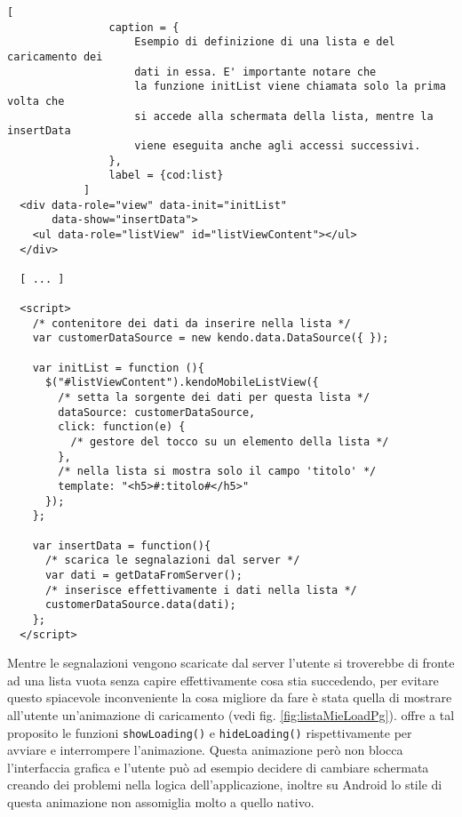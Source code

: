             \begin{lstlisting}[
                caption = {
                    Esempio di definizione di una lista e del caricamento dei
                    dati in essa. E' importante notare che
                    la funzione initList viene chiamata solo la prima volta che
                    si accede alla schermata della lista, mentre la insertData
                    viene eseguita anche agli accessi successivi.
                },
                label = {cod:list}
            ]
  <div data-role="view" data-init="initList"
       data-show="insertData">
    <ul data-role="listView" id="listViewContent"></ul>
  </div>

  [ ... ]

  <script>
    /* contenitore dei dati da inserire nella lista */
    var customerDataSource = new kendo.data.DataSource({ });

    var initList = function (){
      $("#listViewContent").kendoMobileListView({
        /* setta la sorgente dei dati per questa lista */
        dataSource: customerDataSource,
        click: function(e) {
          /* gestore del tocco su un elemento della lista */
        },
        /* nella lista si mostra solo il campo 'titolo' */
        template: "<h5>#:titolo#</h5>"
      });
    };

    var insertData = function(){
      /* scarica le segnalazioni dal server */
      var dati = getDataFromServer();
      /* inserisce effettivamente i dati nella lista */
      customerDataSource.data(dati);
    };
  </script>
            \end{lstlisting}
            \noindent Mentre le segnalazioni vengono scaricate dal server l'utente si
            troverebbe di fronte ad una lista vuota senza capire effettivamente
            cosa stia succedendo, per evitare questo spiacevole inconveniente
            la cosa migliore da fare è stata quella di mostrare all'utente un'animazione
            di caricamento (vedi fig. \ref{fig:listaMieLoadPg}). \kendomob{} offre a tal proposito le funzioni
            \texttt{showLoading()} e \texttt{hideLoading()} rispettivamente per
            avviare e interrompere l'animazione. Questa animazione però non blocca
            l'interfaccia grafica e l'utente può ad esempio decidere
            di cambiare schermata creando dei problemi nella logica dell'applicazione,
            inoltre su Android lo stile di questa animazione non assomiglia molto
            a quello nativo.

